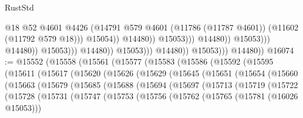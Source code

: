 \begin{lexlean}{RustStd}
\begin{coremodule}
                                                              @18
                                                              @52
                                                              @4601
                                                              @4426
                                                              (@14791
                                                                @579
                                                                @4601
                                                                (@11786 (@11787 @4601))
                                                                (@11602 (@11792 @579 @18)))
                                                              @15054))
                                                          @14480))
                                                      @15053)))
                                                @14480))
                                            @15053)))
                                      @14480))
                                  @15053)))
                            @14480))
                        @15053)))
                  @14480))
              @15053)))
        @14480))
@16074 := @15552
    (@15558
      (@15561
        (@15577
          (@15583
            (@15586
              (@15592
                (@15595
                  (@15611
                    (@15617
                      (@15620
                        (@15626
                          (@15629
                            (@15645
                              (@15651
                                (@15654
                                  (@15660
                                    (@15663
                                      (@15679
                                        (@15685
                                          (@15688
                                            (@15694
                                              (@15697
                                                (@15713
                                                  (@15719
                                                    (@15722
                                                      (@15728
                                                        (@15731
                                                          (@15747
                                                            (@15753
                                                              (@15756
                                                                (@15762
                                                                  (@15765 (@15781 (@16026 @15053)))

\end{coremodule}
\end{lexlean}
